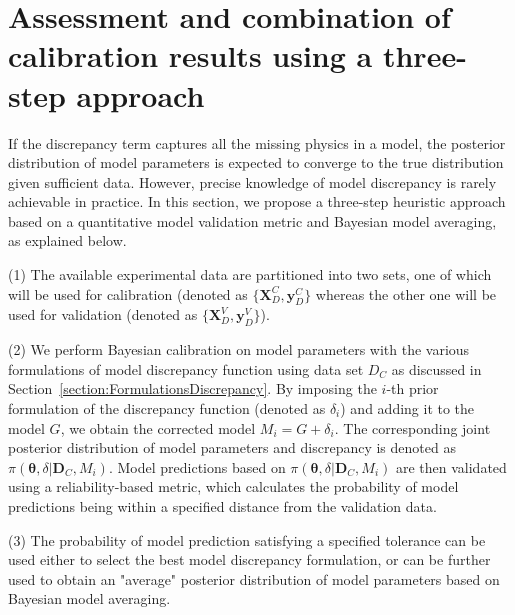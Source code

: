 \documentclass[preprint,review,12pt,3p]{elsarticle}
\begin{document}
\section{Assessment and combination of calibration results using a three-step approach}\label{section:threeSteps}
If the discrepancy term captures all the missing physics in a model, the posterior distribution of model parameters is expected to converge to the true distribution given sufficient data. However, precise knowledge of model discrepancy is rarely achievable in practice. In this section, we propose a three-step heuristic approach based on a quantitative model validation metric and Bayesian model averaging, as explained below.

(1) The available experimental data are partitioned into two sets, one of which will be used for calibration (denoted as $\{\boldsymbol{X}_D^C, \boldsymbol{y}_D^C \}$ whereas the other one will be used for validation (denoted as $\{\boldsymbol{X}_D^V, \boldsymbol{y}_D^V \}$). 

(2) We perform Bayesian calibration on model parameters with the various formulations of model discrepancy function using data set $D_C$ as discussed in Section~\ref{section:FormulationsDiscrepancy}. By imposing the $i$-th prior formulation of the discrepancy function (denoted as $\delta_i$) and adding it to the model $G$, we obtain the corrected model $M_i = G+\delta_i$. The corresponding joint posterior distribution of model parameters and discrepancy is denoted as $\pi(\boldsymbol{\theta},\delta | \boldsymbol{D}_C, M_i)$. Model predictions based on $\pi(\boldsymbol{\theta},\delta | \boldsymbol{D}_C, M_i)$ are then validated using a reliability-based metric, which calculates the probability of model predictions being within a specified distance from the validation data.

(3) The probability of model prediction satisfying a specified tolerance can be used either to select the best model discrepancy formulation, or can be further used to obtain an "average" posterior distribution of model parameters based on Bayesian model averaging.  
\end{document}
